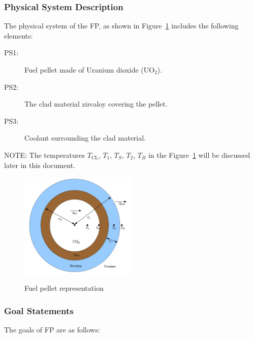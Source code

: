 \subsubsection{Physical System Description}

The physical system of the FP, as shown in
Figure~\ref{Fig_FuelpelletRepresentation} includes the following elements:

\begin{description}

\item[PS1:] Fuel pellet made of Uranium dioxide ($\mathrm{UO_2}$).

\item[PS2:] The clad material zircaloy covering the pellet.

\item[PS3:] Coolant surrounding the clad material.

\end{description}

NOTE: The temperatures $T_{\mathrm{CL}}$, $T_1$, $T_S$, $T_2$, $T_B$ in the
Figure~\ref{Fig_FuelpelletRepresentation} will be discussed later in this
document.

\begin{figure}
\begin{center}
{
 \includegraphics[width=0.5\textwidth]{fuelpin.png}
}
\caption{\label{Fig_FuelpelletRepresentation} Fuel pellet representation}
\end{center}
\end{figure}

\subsubsection{Goal Statements}

The goals of  FP are as follows:

